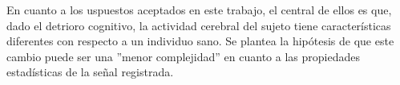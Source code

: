 En cuanto a los uspuestos aceptados en este trabajo, el central de ellos es que, dado el detrioro
cognitivo, la actividad cerebral del sujeto tiene caracter\'isticas diferentes con respecto a un
individuo sano. Se plantea la hip\'otesis de que este cambio puede ser una ''menor complejidad'' 
en cuanto a las propiedades estad\'isticas de la se\~nal registrada. 



